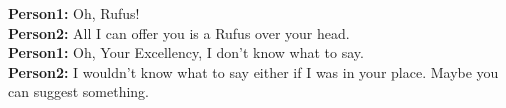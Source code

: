 \documentclass[
	letterpaper, %
	12pt, %
	unnumberedsections, %
	twoside, %
]{LTJournalArticle}
\begin{document}
\begin{appendices}
{		\noindent\textbf{Person1:}  Oh, Rufus! \\
		\noindent\textbf{Person2:}  All I can offer you is a Rufus over your head. \\
		\noindent\textbf{Person1:}  Oh, Your Excellency, I don't know what to say. \\
		\noindent\textbf{Person2:}  I wouldn't know what to say either if I was in your place.  Maybe you can suggest something. \\


	}



\end{appendices}
%
\end{document}
